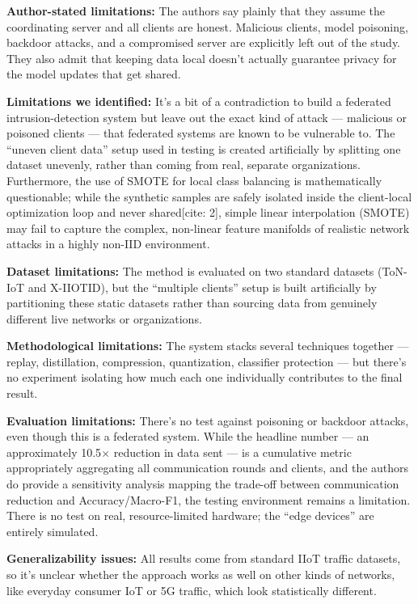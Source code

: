 \documentclass[10pt]{article}
\newcommand{\sumitem}[2]{\noindent\textbf{#1:} #2\par}
\begin{document}
\sumitem{Author-stated limitations}{The authors say plainly that they assume the coordinating server and all clients are honest. Malicious clients, model poisoning, backdoor attacks, and a compromised server are explicitly left out of the study. They also admit that keeping data local doesn't actually guarantee privacy for the model updates that get shared.}

\sumitem{Limitations we identified}{It's a bit of a contradiction to build a federated intrusion-detection system but leave out the exact kind of attack --- malicious or poisoned clients --- that federated systems are known to be vulnerable to. The \enquote{uneven client data} setup used in testing is created artificially by splitting one dataset unevenly, rather than coming from real, separate organizations. Furthermore, the use of SMOTE for local class balancing is mathematically questionable; while the synthetic samples are safely isolated inside the client-local optimization loop and never shared[cite: 2], simple linear interpolation (SMOTE) may fail to capture the complex, non-linear feature manifolds of realistic network attacks in a highly non-IID environment.}

\sumitem{Dataset limitations}{The method is evaluated on two standard datasets (ToN-IoT and X-IIOTID), but the \enquote{multiple clients} setup is built artificially by partitioning these static datasets rather than sourcing data from genuinely different live networks or organizations.}

\sumitem{Methodological limitations}{The system stacks several techniques together --- replay, distillation, compression, quantization, classifier protection --- but there's no experiment isolating how much each one individually contributes to the final result.}

\sumitem{Evaluation limitations}{There's no test against poisoning or backdoor attacks, even though this is a federated system. While the headline number --- an approximately 10.5$\times$ reduction in data sent --- is a cumulative metric appropriately aggregating all communication rounds and clients, and the authors do provide a sensitivity analysis mapping the trade-off between communication reduction and Accuracy/Macro-F1, the testing environment remains a limitation. There is no test on real, resource-limited hardware; the \enquote{edge devices} are entirely simulated.}

\sumitem{Generalizability issues}{All results come from standard IIoT traffic datasets, so it's unclear whether the approach works as well on other kinds of networks, like everyday consumer IoT or 5G traffic, which look statistically different.}
\end{document}
